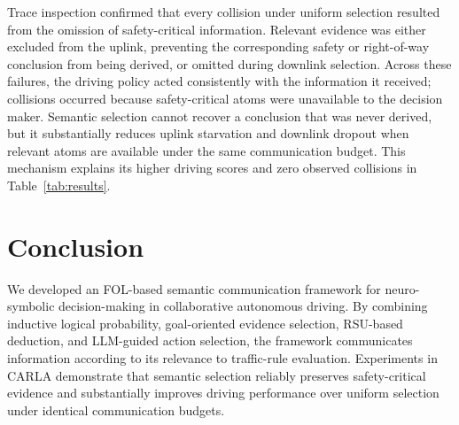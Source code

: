 \documentclass[10pt, conference, letterpaper]{ IEEEtran}
\theoremstyle{bfnote}
\begin{document}
Trace inspection confirmed that every collision under uniform selection
resulted from the omission of safety-critical information. Relevant
evidence was either excluded from the uplink, preventing the corresponding
safety or right-of-way conclusion from being derived, or omitted during
downlink selection. Across these failures, the driving policy acted
consistently with the information it received; collisions occurred because
safety-critical atoms were unavailable to the decision maker. Semantic
selection cannot recover a conclusion that was never derived, but it
substantially reduces uplink starvation and downlink dropout when relevant
atoms are available under the same communication budget. This mechanism
explains its higher driving scores and zero observed collisions in
Table~\ref{tab:results}.

\section{Conclusion}
We developed an FOL-based semantic communication framework for neuro-symbolic decision-making in collaborative autonomous driving. By combining inductive logical probability, goal-oriented evidence selection, RSU-based deduction, and LLM-guided action selection, the framework communicates information according to its relevance to traffic-rule evaluation. Experiments in CARLA demonstrate that semantic selection reliably preserves safety-critical evidence and substantially improves driving performance over uniform selection under identical communication budgets.

\end{document}
